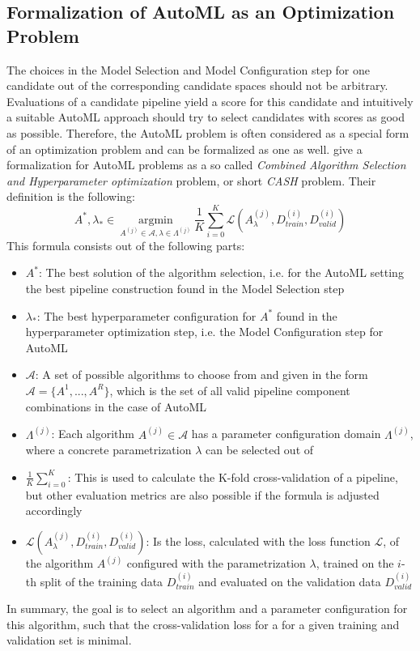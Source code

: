 \subsection{Formalization of AutoML as an Optimization Problem}
\label{sec:theory:automl:optimization}
The choices in the Model Selection and Model Configuration step for one candidate out of the corresponding candidate spaces should not be arbitrary.
Evaluations of a candidate pipeline yield a score for this candidate and intuitively a suitable AutoML approach should try to select candidates with scores as good as possible.
Therefore, the AutoML problem is often considered as a special form of an optimization problem and can be formalized as one as well.\newline
\textcite{Feurer-Cash} give a formalization for AutoML problems as a so called \textit{Combined Algorithm Selection and Hyperparameter optimization} problem, or short \textit{CASH} problem.
Their definition is the following:
\begin{equation*}
    A^*, \lambda_* \in \> \underset{A^{(j)} \in \mathcal{A},\lambda \in \Lambda^{(j)}}{\mathrm{argmin}} \> \frac{1}{K} \sum_{i=0}^K \mathcal{L} (A_\lambda^{(j)}, D_{\textit{train}}^{(i)}, D_{\textit{valid}}^{(i)})
\end{equation*}
This formula consists out of the following parts:
\begin{itemize}
    \item $A^*$: The best solution of the algorithm selection, i.e. for the AutoML setting the best pipeline construction found in the Model Selection step
    \item $\lambda_*$: The best hyperparameter configuration for $A^*$ found in the hyperparameter optimization step, i.e. the Model Configuration step for AutoML
    \item $\mathcal{A}$: A set of possible algorithms to choose from and given in the form $\mathcal{A} = \{A^{1}, ..., A^{R} \}$, which is the set of all valid pipeline component combinations in the case of AutoML
    \item $\Lambda^{(j)}$: Each algorithm $A^{(j)} \in \mathcal{A}$ has a parameter configuration domain $\Lambda^{(j)}$, where a concrete parametrization $\lambda$ can be selected out of
    \item $\frac{1}{K} \sum_{i=0}^K $: This is used to calculate the K-fold cross-validation of a pipeline, but other evaluation metrics are also possible if the formula is adjusted accordingly
    \item $\mathcal{L} (A_\lambda^{(j)}, D_{\textit{train}}^{(i)}, D_{\textit{valid}}^{(i)})$: Is the loss, calculated with the loss function $\mathcal{L}$, of the algorithm $A^{(j)}$ configured with the parametrization $\lambda$, trained on the $i$-th split of the training data $D_{\textit{train}}^{(i)}$ and evaluated on the validation data $D_{\textit{valid}}^{(i)}$
\end{itemize}
In summary, the goal is to select an algorithm and a parameter configuration for this algorithm, such that the cross-validation loss for a for a given training and validation set is minimal.

